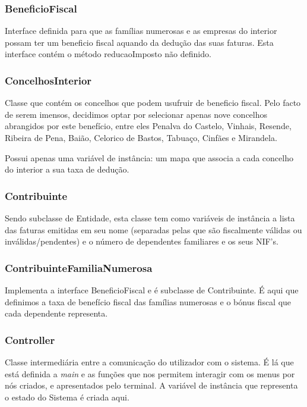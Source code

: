 \documentclass[a4paper]{article}
\begin{document}
	
\subsubsection{BeneficioFiscal} %


Interface definida para que as famílias numerosas e as empresas do interior
possam ter um beneficio fiscal aquando da dedução das suas faturas.
Esta interface contém o método reducaoImposto não definido.


\subsubsection{ConcelhosInterior} %

Classe que contém os concelhos que podem usufruir de beneficio fiscal. Pelo facto de serem imensos, decidimos optar por selecionar apenas nove concelhos abrangidos por este benefício, entre eles Penalva do Castelo, Vinhais, Resende, Ribeira de Pena, Baião, Celorico de Bastos, Tabuaço, Cinfães e Mirandela.

Possui apenas uma variável de instância: um mapa que associa a cada concelho do interior a sua taxa de dedução.


\subsubsection{Contribuinte} %

Sendo subclasse de Entidade, esta classe tem como variáveis de instância a lista das faturas emitidas em seu nome (separadas pelas que são 
fiscalmente válidas ou inválidas/pendentes) e o número de dependentes familiares e os seus NIF's.


\subsubsection{ContribuinteFamiliaNumerosa} %

Implementa a interface BeneficioFiscal e é subclasse de Contribuinte. É aqui que definimos a taxa de benefício fiscal das famílias numerosas e o bónus fiscal que cada dependente representa.


\subsubsection{Controller} %

Classe intermediária entre a comunicação do utilizador com o sistema. É lá que está definida a \textit{main} e as funções que nos permitem interagir com os menus por nós criados, e apresentados pelo terminal. A variável de instância que representa o estado do Sistema é criada aqui.
\end{document}
